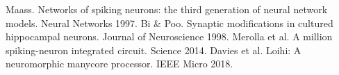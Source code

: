 \documentclass[conference]{IEEEtran}
\begin{document}
\begin{thebibliography}{00}
 Maass. Networks of spiking neurons: the third generation of neural network models. Neural Networks 1997.
 Bi & Poo. Synaptic modifications in cultured hippocampal neurons. Journal of Neuroscience 1998.
 Merolla et al. A million spiking-neuron integrated circuit. Science 2014.
 Davies et al. Loihi: A neuromorphic manycore processor. IEEE Micro 2018.
\end{thebibliography}
\end{document}
